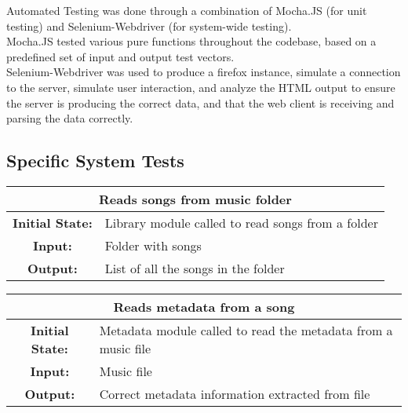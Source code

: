 \documentclass[12pt, titlepage]{article}
\begin{document}
Automated Testing was done through a combination of Mocha.JS (for unit testing) and Selenium-Webdriver (for system-wide testing). \\


Mocha.JS tested various pure functions throughout the codebase, based on a predefined set of input and output test vectors. \\

Selenium-Webdriver was used to produce a firefox instance, simulate a connection to the server, simulate user interaction, and analyze the HTML output to ensure the server is producing the correct data, and that the web client is receiving and parsing the data correctly.
        
\subsection{Specific System Tests}


\begin{center}
\begin{table}[H]
\begin{tabularx}{\textwidth}{| c X |}
\hline
\multicolumn{2}{|c|}{\textbf{Reads songs from music folder}}\\
\hline
\textbf{Initial State: } & Library module called to read songs from a folder\\
\textbf{Input: } & Folder with songs\\
\textbf{Output: } & List of all the songs in the folder\\
\hline
\end{tabularx}
\end{table}
\end{center}


\begin{center}
\begin{table}[H]
\begin{tabularx}{\textwidth}{| c X |}
\hline
\multicolumn{2}{|c|}{\textbf{Reads metadata from a song}}\\
\hline
\textbf{Initial State: } & Metadata module called to read the metadata from a music file\\
\textbf{Input: } & Music file\\
\textbf{Output: } & Correct metadata information extracted from file\\
\hline
\end{tabularx}
\end{table}
\end{center}
\end{document}
